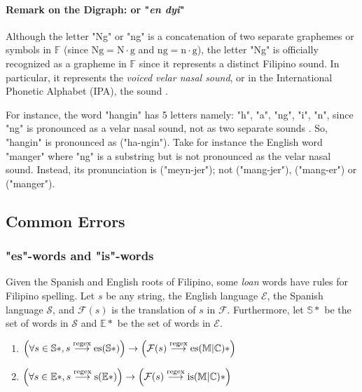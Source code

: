 \paragraph{Remark on the Digraph:  or "\textit{en dyi}"}

Although the letter "Ng" or "ng" is a concatenation of two separate graphemes or
symbols in \(\mathbb{F}\) (since \(\text{Ng} = \text{N}\cdot\text{g}\) and
\(\text{ng} = \text{n}\cdot\text{g}\)), the letter "Ng" is officially recognized
as a grapheme in \(\mathbb{F}\) since it represents a distinct Filipino sound.
In particular, it represents the \textit{voiced velar nasal sound}, or in the International
Phonetic Alphabet (IPA), the  sound \cite{Malabonga_2009}.

For instance, the word "hangin" has 5 letters namely: "h", "a", "ng", "i", "n",
since "ng" is pronounced as a velar nasal sound, not as two separate sounds
. So, "hangin" is pronounced as  ("ha-ngin").
Take for instance the English  word "manger" where "ng" is a substring
but is not pronounced as the velar nasal sound. Instead, its pronunciation is
 ("meyn-jer"); not
 ("mang-jer"),
 ("mang-er") or
 ("manger").

\subsection{Common Errors}

\subsubsection{"es"-words and "is"-words}

Given the Spanish and English roots of Filipino, some \textit{loan} words have
rules for Filipino spelling. Let \(s\) be any string, the English language
\(\mathcal{E}\), the Spanish language \(\mathcal{S}\), and \(\mathcal{F}(s)\) is
the translation of \(s\) in \(\mathcal{F}\). Furthermore, let \(\mathbb{S}*\) be
the set of words in \(\mathcal{S}\) and \(\mathbb{E}*\) be the set of words in
\(\mathcal{E}\).

\begin{enumerate}
    \item \(\left(\forall s\in \mathbb{S}*,s \overset{\text{regex}}{\longrightarrow} \text{es}(\mathbb{S}*) \right) \rightarrow \left(\mathcal{F}(s) \overset{\text{regex}}{\longrightarrow} \text{es}
              (\mathbb{M}|\mathbb{C})*\right) \)
    \item \(\left(\forall s\in \mathbb{E}*,s \overset{\text{regex}}{\longrightarrow} \text{s}(\mathbb{E}*)\right) \rightarrow  \left(\mathcal{F}(s) \overset{\text{regex}}{\longrightarrow} \text{is}
              (\mathbb{M}|\mathbb{C})* \right)\)
\end{enumerate}

